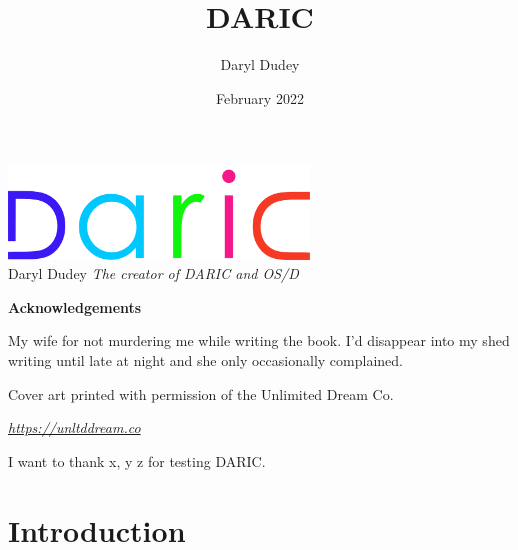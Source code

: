 \documentclass[10pt]{book}
\title{DARIC}
\author{Daryl Dudey}
\date{February 2022}
\makeatletter
\newcommand{\DARIC}{DARIC}
\newcommand\ackname{Acknowledgements}
\newenvironment{acknowledgements}{%
      \@beginparpenalty\@lowpenalty
      \begin{center}%
        \bfseries \ackname
      \end{center}}%
\makeatother
\begin{document}
\begin{titlepage}
    \centering
	\includegraphics[width=8cm]{_Logo.png}\\
    \vskip1cm
	\setlength{\fboxrule}{1pt}
    \vskip1cm
    \huge{Daryl Dudey}
    \vskip0.25cm
    \normalsize{\emph{The creator of \DARIC{} and OS/D}}
\end{titlepage}
\begin{acknowledgements}
\par{My wife for not murdering me while writing the book. I'd disappear into my shed writing until late at night and she only occasionally complained.}
\par{Cover art printed with permission of the Unlimited Dream Co.}
\begin{center}
\emph{\url{https://unltddream.co}}
\end{center}
\par{I want to thank x, y z for testing \DARIC{}.}
\end{acknowledgements}

\tableofcontents

\chapter{Introduction}
\end{document}
